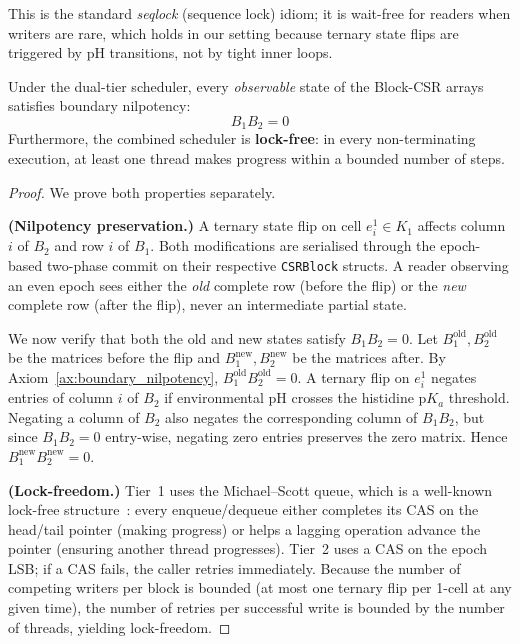 This is the standard \emph{seqlock} (sequence lock) idiom; it is wait-free
for readers when writers are rare, which holds in our setting because
ternary state flips are triggered by pH transitions, not by tight inner
loops.

\begin{theorem}
\label{thm:concurrency}
Under the dual-tier scheduler, every \emph{observable} state of the
Block-CSR arrays satisfies boundary nilpotency:
\begin{equation}
    B_1 B_2 = 0
\end{equation}
Furthermore, the combined scheduler is \textbf{lock-free}: in every
non-terminating execution, at least one thread makes progress within a
bounded number of steps.
\end{theorem}

\begin{proof}
We prove both properties separately.

\noindent\textbf{(Nilpotency preservation.)}
A ternary state flip on cell $e_i^1 \in K_1$ affects column $i$ of $B_2$
and row $i$ of $B_1$.  Both modifications are serialised through the
epoch-based two-phase commit on their respective \texttt{CSRBlock} structs.
A reader observing an even epoch sees either the \emph{old} complete row
(before the flip) or the \emph{new} complete row (after the flip), never
an intermediate partial state.

We now verify that both the old and new states satisfy $B_1 B_2 = 0$.
Let $B_1^{\text{old}}, B_2^{\text{old}}$ be the matrices before the flip
and $B_1^{\text{new}}, B_2^{\text{new}}$ be the matrices after.  By
Axiom~\ref{ax:boundary_nilpotency}, $B_1^{\text{old}} B_2^{\text{old}} = 0$.
A ternary flip on $e_i^1$ negates entries of column $i$ of $B_2$ if
environmental pH crosses the histidine p$K_a$ threshold.  Negating a
column of $B_2$ also negates the corresponding column of $B_1 B_2$, but
since $B_1 B_2 = 0$ entry-wise, negating zero entries preserves the zero
matrix.  Hence $B_1^{\text{new}} B_2^{\text{new}} = 0$.

\noindent\textbf{(Lock-freedom.)}
Tier~1 uses the Michael--Scott queue, which is a well-known lock-free
structure~\cite{michael1996simple}: every enqueue/dequeue either
completes its CAS on the head/tail pointer (making progress) or helps
a lagging operation advance the pointer (ensuring another thread
progresses).  Tier~2 uses a CAS on the epoch LSB; if a CAS fails, the
caller retries immediately.  Because the number of competing writers per
block is bounded (at most one ternary flip per 1-cell at any given time),
the number of retries per successful write is bounded by the number of
threads, yielding lock-freedom.
\end{proof}

